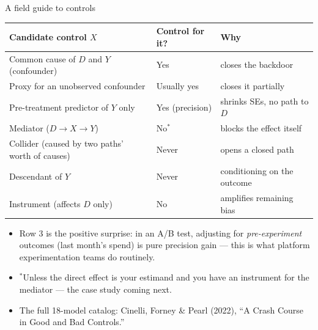 \documentclass[aspectratio=169,11pt]{beamer}
\begin{document}
\begin{frame}{A field guide to controls}
\begin{center}
\small
\begin{tabular}{lll}
\hline
Candidate control $X$ & Control for it? & Why \\
\hline
Common cause of $D$ and $Y$ (confounder) & \alert{Yes} & closes the backdoor \\
Proxy for an unobserved confounder & Usually yes & closes it partially \\
Pre-treatment predictor of $Y$ only & Yes (\alert{precision}) & shrinks SEs, no path to $D$ \\
Mediator ($D \rightarrow X \rightarrow Y$) & No$^{*}$ & blocks the effect itself \\
Collider (caused by two paths' worth of causes) & \alert{Never} & opens a closed path \\
Descendant of $Y$ & \alert{Never} & conditioning on the outcome \\
Instrument (affects $D$ only) & No & \alert{amplifies} remaining bias \\
\hline
\end{tabular}
\end{center}
\smallskip
\begin{itemize}
	\item Row 3 is the positive surprise: in an A/B test, adjusting for
	\emph{pre-experiment} outcomes (last month's spend) is pure precision gain ---
	this is what platform experimentation teams do routinely.
	\item $^{*}$Unless the \alert{direct} effect is your estimand and you have an
	instrument for the mediator --- the case study coming next.
	\item The full 18-model catalog: Cinelli, Forney \& Pearl (2022), ``A Crash
	Course in Good and Bad Controls.''
\end{itemize}
\end{frame}
\end{document}
